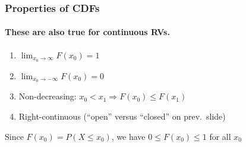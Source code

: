 \documentclass[handout]{beamer}
\begin{document}

\begin{frame}
\frametitle{Properties of CDFs}
\framesubtitle{These are also true for continuous RVs.}
	\begin{enumerate}
		\item $\lim_{x_0 \rightarrow \infty} F(x_0) = 1$
		\item $\lim_{x_0 \rightarrow -\infty} F(x_0) = 0$
		\item Non-decreasing: $x_0 < x_1 \Rightarrow F(x_0)\leq F(x_1)$
		\item Right-continuous (``open'' versus ``closed'' on prev.\ slide)
	\end{enumerate}
	
	
	 
	
	
\vspace{1em}
\begin{alertblock}{Since $F(x_0) = P(X\leq x_0)$,  we have $0\leq F(x_0)\leq 1$ for all $x_0$}\end{alertblock}
\end{frame}
\end{document}
